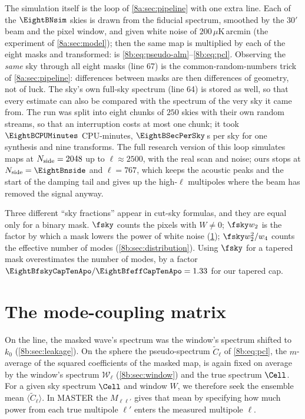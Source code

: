 The simulation itself is the loop of \cref{8a:sec:pipeline} with one extra line. Each of the
$\EightBNsim$ skies is drawn from the fiducial spectrum, smoothed by the $30'$ beam and the pixel window,
and given white noise of $200\,\mu$K\,arcmin (the experiment of \cref{8a:sec:model}); then the same map
is multiplied by each of the eight masks and transformed:
\noindent
{} is \eqref{8b:eq:pseudo-alm}--\eqref{8b:eq:pcl}. Observing the \emph{same} sky through all
eight masks (line 67) is the common-random-numbers trick of \cref{8a:sec:pipeline}: differences
between masks are then differences of geometry, not of luck. The sky's own full-sky spectrum
(line 64) is stored as well, so that every estimate can also be compared with the spectrum of the
very sky it came from. The run was split into eight chunks of $250$ skies with their own random
streams, so that an interruption costs at most one chunk; it took $\EightBCPUMinutes$ CPU-minutes,
$\EightBSecPerSky$\,s per sky for one synthesis and nine transforms. The full research version of
this loop simulates maps at $N_{\rm side}=2048$ up to $\ell\approx2500$, with the real scan and noise;
ours stops at $N_{\rm side}=\EightBnside$ and $\ell=767$, which keeps the acoustic peaks and the start
of the damping tail and gives up the high-$\ell$ multipoles where the beam has removed the signal
anyway.

\begin{pitfall}
Three different ``sky fractions'' appear in cut-sky formulas, and they are equal only for a binary
mask. $\fsky$ counts the pixels with $W\neq0$; $\fsky w_2$ is the factor by which a mask lowers
the power of white noise (\cref{8b:sec:coupling}); $\fsky w_2^2/w_4$ counts the effective number of
modes (\cref{8b:sec:distribution}). Using $\fsky$ for a tapered mask overestimates the number of
modes, by a factor $\EightBfskyCapTenApo/\EightBfeffCapTenApo=1.33$ for our tapered cap.
\end{pitfall}
\section{The mode-coupling matrix}
\label{8b:sec:coupling}

On the line, the masked wave's spectrum was the window's spectrum shifted to $k_0$
(\cref{8b:sec:leakage}). On the sphere the pseudo-spectrum $\widetilde C_\ell$ of
\eqref{8b:eq:pcl}, the $m$-average of the squared coefficients of the masked map, is again
fixed on average by the window's spectrum $\mathcal W_\ell$ (\cref{8b:sec:window}) and the true
spectrum $\Cell$. For a given sky spectrum $\Cell$ and window $W$, we therefore seek the
ensemble mean $\langle\widetilde C_\ell\rangle$. In MASTER the
 $M_{\ell\ell'}$ gives that mean by specifying
how much power from each true multipole $\ell'$ enters the measured
multipole $\ell$.

